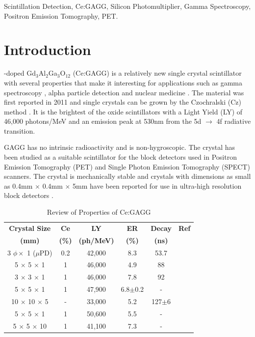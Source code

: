 \documentclass[journal]{IEEEtran}
\begin{document}
\begin{IEEEkeywords}
Scintillation Detection, Ce:GAGG, Silicon Photomultiplier, Gamma Spectroscopy, Positron Emission Tomography, PET.
\end{IEEEkeywords}

\section{Introduction}
-doped Gd$_{3}$Al$_{2}$Ga$_{3}$O$_{12}$ (Ce:GAGG) is a relatively new single crystal scintillator with several properties that make it interesting for applications such as gamma spectroscopy \cite{gamma:iwan, gagg:orita}, alpha particle detection \cite{alpha:morishita, sipm:morishita} and nuclear medicine \cite{gagg:levin, gagg:seitz, gagg:fbk, gagg:schneider, gagg:kamada04}. The material was first reported in 2011 and single crystals can be grown by the Czochralski (Cz) method \cite{gagg:kamada01, gagg:kamada02}. It is the brightest of the oxide scintillators with a Light Yield (LY) of 46,000 photons/MeV and an emission peak at 530nm from the 5d $\rightarrow$ 4f radiative transition. 

GAGG has no intrinsic radioactivity and is non-hygroscopic. The crystal has been studied as a suitable scintillator for the block detectors used in Positron Emission Tomography (PET) and Single Photon Emission Tomography (SPECT) scanners. The crystal is mechanically stable and crystals with dimensions as small as 0.4mm $\times$ 0.4mm $\times$ 5mm have been reported for use in ultra-high resolution block detectors \cite{yamamoto:ultrahigh}.  


\begin{table}[bt]
\renewcommand{\arraystretch}{1.3}
\caption{Review of Properties of Ce:GAGG}
\label{tab:gagg_review}
\centering
\begin{tabular}{ c | c | c | c | c | c }
\hline
\bfseries Crystal Size & \bfseries Ce & \bfseries LY & \bfseries ER & \bfseries Decay & \bfseries Ref \\
\bfseries (mm) & \bfseries (\%) & \bfseries (ph/MeV) & \bfseries (\%) & \bfseries (ns) & \\
\hline \hline
3 $\phi{} \times{}$ 1 ($\mu$PD) & 0.2 & 42,000 & 8.3 & 53.7 &\cite{kamada:sc_scint} \\
\hline
5 $\times$ 5 $\times$ 1 & 1 & 46,000 & 4.9 & 88 & \cite{gagg:kamada02} \\
\hline
3 $\times$ 3 $\times$ 1 & 1 & 46,000 & 7.8 & 92 & \cite{gagg:kamada03} \\
\hline
5 $\times$ 5 $\times$ 1 & 1 & 47,900 & 6.8$\pm{}$0.2 & - & \cite{sakthong:gagg} \\
\hline
10 $\times$ 10 $\times$ 5 & - & 33,000 & 5.2 & 127$\pm$6 & \cite{gamma:iwan} \\
\hline 
5 $\times$ 5 $\times$ 1 & 1 & 50,600 & 5.5 & - &\\
5 $\times$ 5 $\times$ 10 & 1 & 41,100 & 7.3 & - & \cite{prusa:lightyeild} \\
\hline
\end{tabular}
\end{table} 
\end{document}
